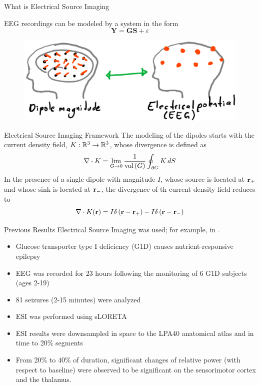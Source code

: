 \documentclass[progressbar=head]{beamer}
\begin{document}
\begin{frame}{What is Electrical Source Imaging}


EEG recordings can be modeled by a system in the form 
\begin{equation}
\mathbf{Y} = \mathbf{G} \mathbf{S} + \varepsilon
\end{equation}

\begin{figure}
\centering
\includegraphics[width=0.75\linewidth]{./img_oldbeamer/sketch04}
\end{figure}
\end{frame}

\begin{frame}{Electrical Source Imaging Framework}
    The modeling of the dipoles starts with the \alert{current density field}, $K: \mathbb{R}^3 \rightarrow \mathbb{R}^3$, whose divergence is defined as
    \begin{equation}
        \nabla \cdot K = \lim_{G \rightarrow 0} \frac{1}{\text{vol}\left( G \right)}
        \oint_{\partial G} K\, dS
    \end{equation}
    In the presence of a single dipole with magnitude $I$, whose source is located at $\mathbf{r}_{+}$ and whose sink is located at $\mathbf{r}_{-}$, the divergence of th current density field reduces to
    \begin{equation}
        \nabla \cdot K(\mathbf{r}) = I \delta\left( \mathbf{r}-\mathbf{r}_+ \right) - I \delta\left( \mathbf{r}-\mathbf{r}_- \right)
        \label{eq:curr_density}
    \end{equation}
\end{frame}

\begin{frame}{Previous Results}
Electrical Source Imaging was used; for example, 
in
\cite{dr_pascal}.

\begin{itemize}
\item Glucose transporter type I deficiency (G1D) causes nutrient-responsive epilepsy
\item EEG was recorded for 23 hours following the monitoring
of 6 G1D subjects (ages 2-19)
\item 81 seizures (2-15 minutes) were analyzed
\item ESI was performed using sLORETA
\item ESI results were downsampled in space to the LPA40 anatomical atlas and in time to 20\% segments
\item From 20\% to 40\% of duration, significant changes of relative power (with respect to baseline) were observed to be significant on
the sensorimotor cortex and the thalamus.
\end{itemize}
\end{frame}
\end{document}
